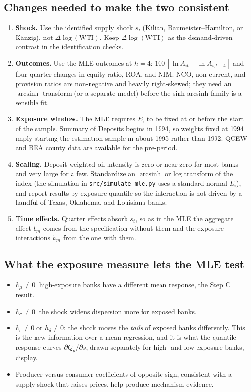 \documentclass[11pt]{article}
\begin{document}
\subsection*{Changes needed to make the two consistent}
\begin{enumerate}
  \item \textbf{Shock.} Use the identified supply shock $s_t$ (Kilian, Baumeister--Hamilton, or K\"anzig), not $\Delta\log(\text{WTI})$. Keep $\Delta\log(\text{WTI})$ as the demand-driven contrast in the identification checks.
  \item \textbf{Outcomes.} Use the MLE outcomes at $h=4$: $100\,[\ln A_{it}-\ln A_{i,t-4}]$ and four-quarter changes in equity ratio, ROA, and NIM. NCO, non-current, and provision ratios are non-negative and heavily right-skewed; they need an $\operatorname{arcsinh}$ transform (or a separate model) before the sinh-arcsinh family is a sensible fit.
  \item \textbf{Exposure window.} The MLE requires $E_i$ to be fixed at or before the start of the sample. Summary of Deposits begins in 1994, so weights fixed at 1994 imply starting the estimation sample in about 1995 rather than 1992. QCEW and BEA county data are available for the pre-period.
  \item \textbf{Scaling.} Deposit-weighted oil intensity is zero or near zero for most banks and very large for a few. Standardize an $\operatorname{arcsinh}$ or log transform of the index (the simulation in \texttt{src/simulate\_mle.py} uses a standard-normal $E_i$), and report results by exposure quantile so the interaction is not driven by a handful of Texas, Oklahoma, and Louisiana banks.
  \item \textbf{Time effects.} Quarter effects absorb $s_t$, so as in the MLE the aggregate effect $b_m$ comes from the specification without them and the exposure interactions $h_m$ from the one with them.
\end{enumerate}

\subsection*{What the exposure measure lets the MLE test}
\begin{itemize}
  \item $h_\mu\neq 0$: high-exposure banks have a different mean response, the Step C result.
  \item $h_\sigma\neq 0$: the shock widens dispersion more for exposed banks.
  \item $h_\epsilon\neq 0$ or $h_\delta\neq 0$: the shock moves the \emph{tails} of exposed banks differently. This is the new information over a mean regression, and it is what the quantile-response curves $\partial Q_p/\partial s$, drawn separately for high- and low-exposure banks, display.
  \item Producer versus consumer coefficients of opposite sign, consistent with a supply shock that raises prices, help produce mechanism evidence.
\end{itemize}
\end{document}
